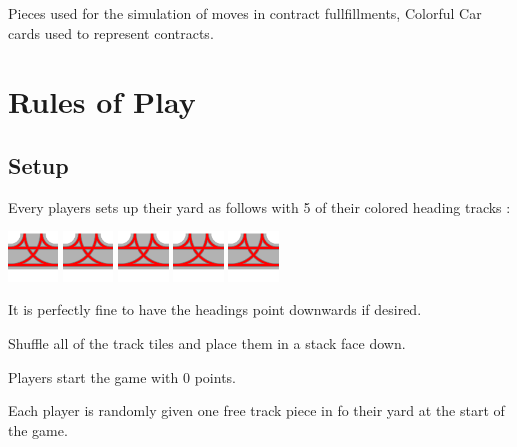 \documentclass[12pt, letterpaper]{article}
\begin{document}

Pieces used for the simulation of moves in contract fullfillments, Colorful Car cards used to represent contracts.

\newpage
\section{Rules of Play}

\subsection{Setup}

Every players sets up their yard as follows with 5 of their colored heading tracks :

\includegraphics[width=0.10\textwidth]{RedHeading.png}
\includegraphics[width=0.10\textwidth]{RedHeading.png}
\includegraphics[width=0.10\textwidth]{RedHeading.png}
\includegraphics[width=0.10\textwidth]{RedHeading.png}
\includegraphics[width=0.10\textwidth]{RedHeading.png}

It is perfectly fine to have the headings point downwards if desired.

Shuffle all of the track tiles and place them in a stack face down.

Players start the game with 0 points.

Each player is randomly given one free track piece in fo their yard at the start of the game.
\end{document}
